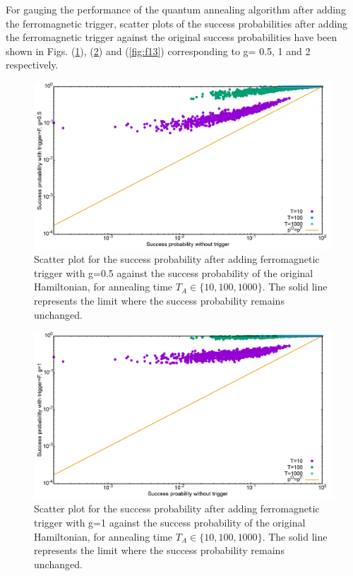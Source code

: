 \documentclass[../main.tex]{subfiles}
\begin{document}
For gauging the performance of the quantum annealing algorithm after adding the ferromagnetic trigger, scatter plots of the success probabilities after adding the ferromagnetic trigger against the original success probabilities have been shown in Figs. (\ref{fig:f11}), (\ref{fig:f12}) and (\ref{fig:f13}) corresponding to g= 0.5, 1 and 2 respectively.
\begin{figure}[H]
\centering 
\includegraphics[scale=0.24]{Scatt_s12_F_g0.png}
\caption{Scatter plot for the success probability after adding ferromagnetic trigger with g=0.5 against the success probability of the original Hamiltonian, for annealing time $T_A \in \{10,100,1000\}$. The solid line represents the limit where the success probability remains unchanged.}
\label{fig:f11}
\end{figure}
\begin{figure}[H]
\centering
\includegraphics[scale=0.24]{Scatt_s12_F_g1.png}
\caption{Scatter plot for the success probability after adding ferromagnetic trigger with g=1 against the success probability of the original Hamiltonian, for annealing time $T_A \in \{10,100,1000\}$. The solid line represents the limit where the success probability remains unchanged.}
\label{fig:f12}
\end{figure}
\end{document}
